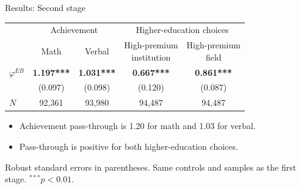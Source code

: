 \documentclass[11pt,aspectratio=169]{beamer}
\newenvironment{wideitemize}{%
  \begin{minipage}{0.92\textwidth}
  \begin{itemize}
  \addtolength{\itemsep}{0.75em}
}{%
  \end{itemize}
  \end{minipage}
}
\begin{document}
\begin{frame}[label=results_one]{Results: Second stage}
\centering
\small
\setlength{\tabcolsep}{7pt}
\renewcommand{\arraystretch}{1.25}
\begin{tabular}{lcccc}
\toprule
& \multicolumn{2}{c}{Achievement} & \multicolumn{2}{c}{Higher-education choices} \\
\cmidrule(lr){2-3}\cmidrule(lr){4-5}
& Math & Verbal & \shortstack{High-premium\\institution} & \shortstack{High-premium\\field} \\
\midrule
$\varphi^{EB}$
& \textbf{1.197***}
& \textbf{1.031***}
& \textbf{0.667***}
& \textbf{0.861***} \\
& (0.097) & (0.098) & (0.120) & (0.087) \\
$N$ & 92,361 & 93,980 & 94,487 & 94,487 \\
\bottomrule
\end{tabular}

\vspace{0.7em}
\begin{wideitemize}
  \item Achievement pass-through is 1.20 for math and 1.03 for verbal.
  \item Pass-through is positive for both higher-education choices.
\end{wideitemize}

\vspace{0.25em}
\hyperlink{heterogeneity_baseline}{}
\hspace{0.7em}
\hyperlink{heterogeneity_gender}{}

\vspace{0.35em}
\scriptsize Robust standard errors in parentheses. Same controls and samples as the first stage. $^{***}p<0.01$.
\end{frame}
\end{document}
